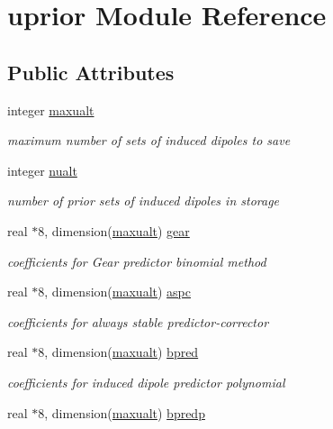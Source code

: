 \hypertarget{classuprior}{\section{uprior Module Reference}
\label{classuprior}
}
\subsection*{Public Attributes}
\begin{DoxyCompactItemize}
\item 
integer \hyperlink{classuprior_a5d9038d2473c8075c0636977eafb4d57}{maxualt}
\begin{DoxyCompactList}\small\item\em maximum number of sets of induced dipoles to save \end{DoxyCompactList}\item 
integer \hyperlink{classuprior_acc513c3b29d6e948f29333fa668adff3}{nualt}
\begin{DoxyCompactList}\small\item\em number of prior sets of induced dipoles in storage \end{DoxyCompactList}\item 
real $\ast$8, dimension(\hyperlink{classuprior_a5d9038d2473c8075c0636977eafb4d57}{maxualt}) \hyperlink{classuprior_a2dadbbbb706a9081bda32406b6fdd75c}{gear}
\begin{DoxyCompactList}\small\item\em coefficients for Gear predictor binomial method \end{DoxyCompactList}\item 
real $\ast$8, dimension(\hyperlink{classuprior_a5d9038d2473c8075c0636977eafb4d57}{maxualt}) \hyperlink{classuprior_a41ee89e59357405b080d883f3c4383b6}{aspc}
\begin{DoxyCompactList}\small\item\em coefficients for always stable predictor-\/corrector \end{DoxyCompactList}\item 
real $\ast$8, dimension(\hyperlink{classuprior_a5d9038d2473c8075c0636977eafb4d57}{maxualt}) \hyperlink{classuprior_a701f83e155c86aa0b227727803852c91}{bpred}
\begin{DoxyCompactList}\small\item\em coefficients for induced dipole predictor polynomial \end{DoxyCompactList}\item 
real $\ast$8, dimension(\hyperlink{classuprior_a5d9038d2473c8075c0636977eafb4d57}{maxualt}) \hyperlink{classuprior_aa87db88e9448f50c7a59391771b47fe8}{bpredp}

\end{DoxyCompactItemize}
